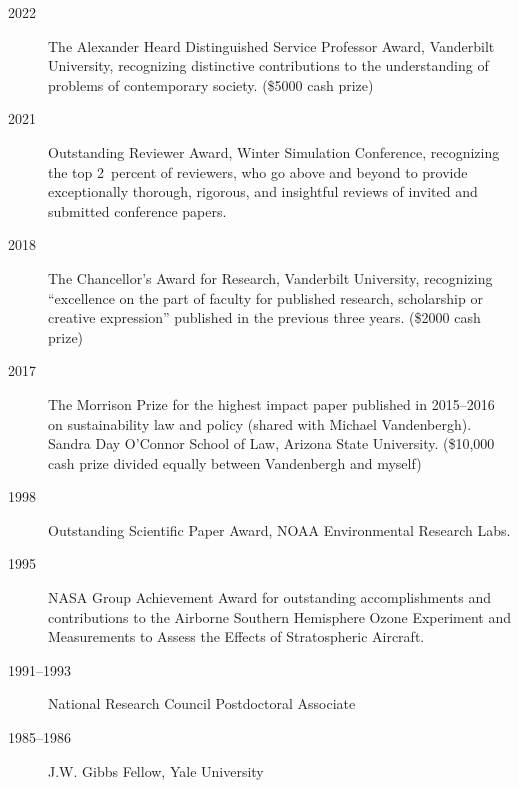 \begin{description}
\item[2022] The Alexander Heard Distinguished Service Professor Award,
  Vanderbilt University, recognizing distinctive contributions to the
  understanding of problems of contemporary society.
  (\$5000 cash prize)
\item[2021] Outstanding Reviewer Award, Winter Simulation Conference,
  recognizing the top 2~percent of reviewers, who go above and beyond to provide
  exceptionally thorough, rigorous, and insightful reviews of invited and
  submitted conference papers.
\item[2018] The Chancellor's Award for Research, Vanderbilt University,
  recognizing ``excellence on the part of faculty for
  published research, scholarship or creative expression'' published in the
  previous three years.
  (\$2000 cash prize)
\item[2017] The Morrison Prize for the highest impact paper published in
  2015--2016 on sustainability law and policy (shared with Michael Vandenbergh).
  Sandra Day O'Connor School of Law, Arizona State University.
  (\$10,000 cash prize divided equally between Vandenbergh and myself)
\item[1998] Outstanding Scientific Paper Award, NOAA Environmental Research
  Labs.
\item[1995] NASA Group Achievement Award for outstanding accomplishments and
  contributions to the Airborne Southern Hemisphere Ozone Experiment and
  Measurements to Assess the Effects of Stratospheric Aircraft.
\item[1991--1993] National Research Council Postdoctoral Associate
\item[1985--1986] J.W. Gibbs Fellow, Yale University
\end{description}
